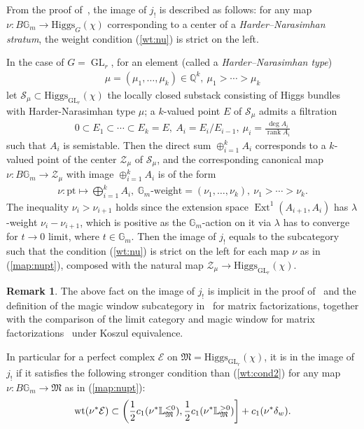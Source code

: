 \documentclass[11pt,oneside,a4paper,mathscr]{amsart}
\theoremstyle{definition}
\newtheorem{remark}[thm]{Remark}
\newcommand{\cE}{\mathcal{E}}
\newcommand{\bgm}{B\mathbb{G}_m}
\newcommand{\Ext}{\operatorname{Ext}}
\newcommand{\GL}{\operatorname{GL}}
\newcommand{\wt}{\mathrm{wt}}
\newcommand{\Hig}{\mathrm{Higgs}}
\begin{document}
From the proof of~\cite[Theorem~7.18 and 7.19]{PTlim}, the image of $j_!$
is described as follows: for any map $\nu \colon \bgm \to \Hig_G(\chi)$
corresponding to a center of a \textit{Harder--Narasimhan stratum}, the 
weight condition (\ref{wt:nu}) is strict on the left. 

In the case of $G=\GL_r$, 
for an element (called a \textit{Harder--Narasimhan type})
\begin{align*}
\mu=(\mu_1, \ldots, \mu_k)\in \mathbb{Q}^k, \ \mu_1>\cdots>\mu_k
\end{align*}
let $\mathcal{S}_{\mu} \subset \Hig_{\GL_r}(\chi)$ the locally 
closed substack consisting of Higgs bundles with Harder-Narasimhan type $\mu$; a $k$-valued point $E$ of $\mathcal{S}_{\mu}$ admits a filtration 
\begin{align*}
    0\subset E_1 \subset \cdots \subset E_k=E, \ A_i=E_i/E_{i-1}, \ 
    \mu_i=\frac{\deg A_i}{\operatorname{rank}A_i}
\end{align*}
such that $A_i$ is semistable. 
Then the direct sum $\oplus_{i=1}^k A_i$ corresponds to a $k$-valued point 
of the center $\mathcal{Z}_{\mu}$ of $\mathcal{S}_{\mu}$, and 
the corresponding 
canonical map $\nu \colon \bgm \to \mathcal{Z}_{\mu}$ with image 
$\oplus_{i=1}^k A_i$ is of the form 
\begin{align}\label{map:nupt}
    \nu\colon \mathrm{pt} \mapsto \bigoplus_{i=1}^k A_i, \
    \mathbb{G}_m \mbox{-weight}=(\nu_1, \ldots, \nu_k), \ 
    \nu_1>\cdots>\nu_k. 
\end{align}
The inequality $\nu_i>\nu_{i+1}$ holds since the extension space $\Ext^1(A_{i+1}, A_i)$ has $\lambda$-weight $\nu_i-\nu_{i+1}$, which is positive as the $\mathbb{G}_m$-action on it via $\lambda$ 
has to converge for $t\to 0$ limit, where $t\in \mathbb{G}_m$. 
Then the image of $j_{!}$ equals to the subcategory such that the 
condition (\ref{wt:nu}) is strict on the left for each map $\nu$ as in (\ref{map:nupt}), composed with the natural map $\mathcal{Z}_{\mu} \to \Hig_{\GL_r}(\chi)$.

\begin{remark}\label{rmk:jshrink}
The above fact on the image of $j_{!}$ 
is implicit in the proof of~\cite[Proposition~8.23]{PTlim} and the definition of the magic window subcategory in~\cite[Definition~8.17]{PTlim} for matrix factorizations, together with the comparison of 
the limit category and magic window for matrix factorizations~\cite[Proposition~3.14]{PTlim} under Koszul equivalence.

In particular for 
a perfect complex $\cE$ on $\mathfrak{M}=\Hig_{\GL_r}(\chi)$, 
it is in the image of $j_!$ if it satisfies the 
following stronger condition than (\ref{wt:cond2})
for any map $\nu \colon \bgm \to \mathfrak{M}$ as in (\ref{map:nupt}):
\begin{align}\notag
    \wt(\nu^* \cE) \subset \left(\frac{1}{2} c_1 (\nu^{\ast}\mathbb{L}_{\mathfrak{M}}^{<0}), 
    \frac{1}{2} c_1 (\nu^{\ast}\mathbb{L}_{\mathfrak{M}}^{>0})
    \right]+c_1(\nu^{\ast}\delta_{w}).
\end{align}
\end{remark}
\end{document}
